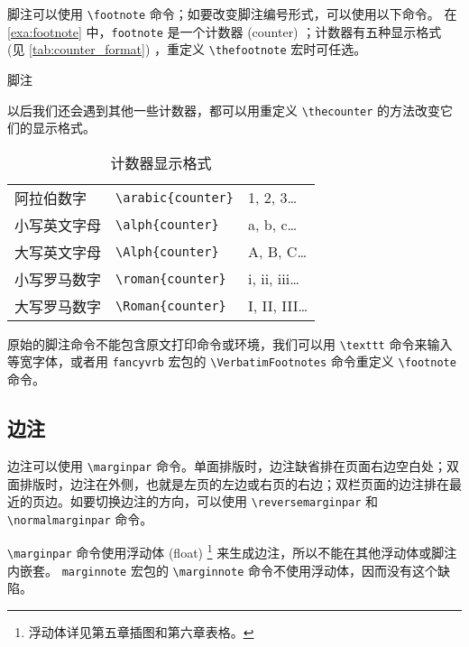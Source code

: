脚注可以使用 \verb|\footnote| 命令；如要改变脚注编号形式，可以使用以下命令。
在 \autoref{exa:footnote} 中，\verb|footnote| 是一个计数器 (counter) ；计数器有五种显示格式 (见 \autoref{tab:counter_format}) ，重定义 \verb|\thefootnote| 宏时可任选。

\begin{example}[h]
\begin{Code}[numbers=left]
\renewcommand{\thefootnote}{\roman{footnote}} %
\end{Code}
\caption{脚注}
\label{exa:footnote}
\end{example}

以后我们还会遇到其他一些计数器，都可以用重定义 \verb|\thecounter| 的方法改变它们的显示格式。

\begin{table}
\centering
\caption{计数器显示格式}
\label{tab:counter_format}
\begin{tabular}{lll}
  \toprule
  阿拉伯数字 & \verb|\arabic{counter}| & 1, 2, 3\dots \\
  小写英文字母 & \verb|\alph{counter}| & a, b, c\dots \\
  大写英文字母 & \verb|\Alph{counter}| & A, B, C\dots \\
  小写罗马数字 & \verb|\roman{counter}| & i, ii, iii\dots \\
  大写罗马数字 & \verb|\Roman{counter}| & I, II, III\dots \\
  \bottomrule
\end{tabular}
\end{table}

原始的脚注命令不能包含原文打印命令或环境，我们可以用 \verb|\texttt| 命令来输入等宽字体，或者用 \texttt{fancyvrb} 宏包的 \verb|\VerbatimFootnotes| 命令重定义 \verb|\footnote| 命令。

\subsection{边注}

边注可以使用 \verb|\marginpar| 命令。单面排版时，边注缺省排在页面右边空白处；双面排版时，边注在外侧，也就是左页的左边或右页的右边；双栏页面的边注排在最近的页边。如要切换边注的方向，可以使用 \verb|\reversemarginpar| 和 \verb|\normalmarginpar| 命令。

\verb|\marginpar| 命令使用浮动体 (float) \footnote{浮动体详见第五章插图和第六章表格。} 来生成边注，所以不能在其他浮动体或脚注内嵌套。 \texttt{marginnote} 宏包的 \verb|\marginnote| 命令不使用浮动体，因而没有这个缺陷。

